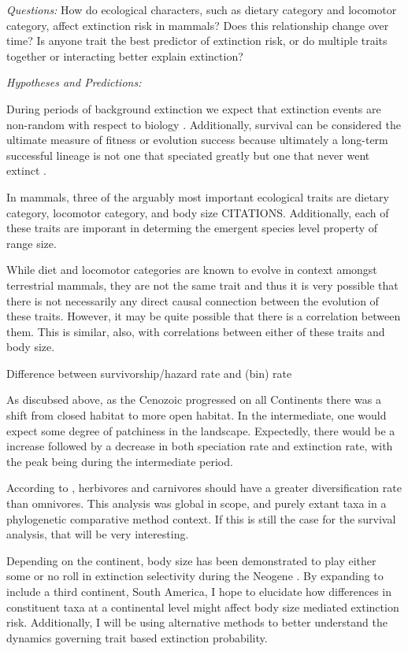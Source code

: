 \documentclass[12pt,letterpaper]{article}
\begin{document}
\textit{Questions:} How do ecological characters, such as dietary category and locomotor category, affect extinction risk in mammals? Does this relationship change over time? Is anyone trait the best predictor of extinction risk, or do multiple traits together or interacting better explain extinction?

\textit{Hypotheses and Predictions:} 

During periods of background extinction we expect that extinction events are non-random with respect to biology \citep{Jablonski1986}. Additionally, survival can be considered the ultimate measure of fitness or evolution success \citep{Cooper1984,Palmer2012} because ultimately a long-term successful lineage is not one that speciated greatly but one that never went extinct \citep{Palmer2012}.

In mammals, three of the arguably most important ecological traits are dietary category, locomotor category, and body size CITATIONS. Additionally, each of these traits are imporant in determing the emergent species level property of range size.

While diet and locomotor categories are known to evolve in context amongst terrestrial mammals, they are not the same trait and thus it is very possible that there is not necessarily any direct causal connection between the evolution of these traits. However, it may be quite possible that there is a correlation between them. This is similar, also, with correlations between either of these traits and body size.


Difference between survivorship/hazard rate and (bin) rate

As discubsed above, as the Cenozoic progressed on all Continents there was a shift from closed habitat to more open habitat. In the intermediate, one would expect some degree of patchiness in the landscape. Expectedly, there would be a increase followed by a decrease in both speciation rate and extinction rate, with the peak being during the intermediate period.

According to \citet{Price2012}, herbivores and carnivores should have a greater diversification rate than omnivores. This analysis was global in scope, and purely extant taxa in a phylogenetic comparative method context. If this is still the case for the survival analysis, that will be very interesting.


Depending on the continent, body size has been demonstrated to play either some or no roll in extinction selectivity during the Neogene \citep{Tomiya2013,Liow2008,Liow2009}. By expanding to include a third continent, South America, I hope to elucidate how differences in constituent taxa at a continental level might affect body size mediated extinction risk. Additionally, I will be using alternative methods to better understand the dynamics governing trait based extinction probability.
\end{document}
